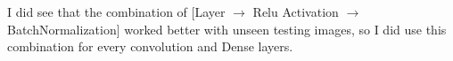 \documentclass[12pt]{article}
\begin{document}
I did see that the combination of [Layer $\rightarrow$ Relu Activation $\rightarrow$ BatchNormalization] worked better with unseen testing images, so I did use this combination for every convolution and Dense layers. \\



\begin{figure}[h]
    \centering
\end{figure}
\end{document}

